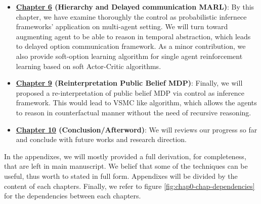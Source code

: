 \begin{itemize}
    \item \textbf{\hyperref[chapter:chap6]{Chapter 6} (Hierarchy and Delayed communication MARL)}: By this chapter, we have examine thoroughly the control as probabilistic infernece frameworks' application on multi-agent setting. We will turn toward augmenting agent to be able to reason in temporal abstraction, which leads to delayed option communication framework. As a minor contribution, we also provide soft-option learning algorithm for single agent reinforcement learning based on soft Actor-Critic algorithms.
    \item \textbf{\hyperref[chapter:chap9]{Chapter 9} (Reinterpretation Public Belief MDP)}: Finally, we will proposed a re-interpretation of public belief MDP via control as inference framework. This would lead to VSMC like algorithm, which allows the agents to reason in counterfactual manner without the need of recursive reasoning.
    \item \textbf{\hyperref[chapter:chap10]{Chapter 10} (Conclusion/Afterword)}: We will reviews our progress so far and conclude with future works and  research direction. 
\end{itemize}
In the appendixes, we will mostly provided a full derivation, for completeness, that are left in main manuscript. We belief that some of the techniques can be useful, thus worth to stated in full form. Appendixes will be divided by the content of each chapters. Finally, we refer to figure \ref{fig:chap0-chap-dependencies} for the dependencies between each chapters.